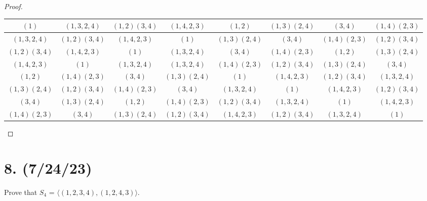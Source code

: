 \documentclass{article}
\begin{document}
\begin{proof}
    \begin{table}[h]
        \scriptsize
        \setlength{\tabcolsep}{0.4em} %
        \begin{tabu}{ |c|c|c|c|c|c|c|c| } 
            \hline
            $(1)$ & $(1, 3, 2, 4)$ & $(1, 2)(3, 4)$ & $(1, 4, 2, 3)$ & $(1, 2)$ & $(1, 3)(2, 4)$ & $(3, 4)$ & $(1, 4)(2, 3)$ \\
            \hline
            $(1, 3, 2, 4)$ & $(1, 2)(3, 4)$ & $(1, 4, 2, 3)$ & $(1)$ & $(1, 3)(2, 4)$ & $(3, 4)$ & $(1, 4)(2, 3)$ & $(1, 2)(3, 4)$ \\ 
            \hline
            $(1, 2)(3, 4)$ & $(1, 4, 2, 3)$ & $(1)$ & $(1, 3, 2, 4)$ & $(3, 4)$ & $(1, 4)(2, 3)$ & $(1, 2)$ & $(1, 3)(2, 4)$ \\
            \hline
            $(1, 4, 2, 3)$ & $(1)$ & $(1, 3, 2, 4)$ & $(1, 3, 2, 4)$ & $(1, 4)(2, 3)$ & $(1, 2)(3, 4)$ & $(1, 3)(2, 4)$ & $(3, 4)$ \\
            \hline
            $(1, 2)$ & $(1, 4)(2, 3)$ & $(3, 4)$ & $(1, 3)(2, 4)$ & $(1)$ & $(1, 4, 2, 3)$ & $(1, 2)(3, 4)$ & $(1, 3, 2, 4)$ \\
            \hline
            $(1, 3)(2, 4)$ & $(1, 2)(3, 4)$ & $(1, 4)(2, 3)$ & $(3, 4)$ & $(1, 3, 2, 4)$ & $(1)$ & $(1, 4, 2, 3)$ & $(1, 2)(3, 4)$ \\
            \hline
            $(3, 4)$ & $(1, 3)(2, 4)$ & $(1, 2)$ & $(1, 4)(2, 3)$ & $(1, 2)(3, 4)$ & $(1, 3, 2, 4)$ & $(1)$ & $(1, 4, 2, 3)$ \\
            \hline
            $(1, 4)(2, 3)$ & $(3, 4)$ & $(1, 3)(2, 4)$ & $(1, 2)(3, 4)$ & $(1, 4, 2, 3)$ & $(1, 2)(3, 4)$ & $(1, 3, 2, 4)$ & $(1)$ \\
            \hline
        \end{tabu}
    \end{table}
\end{proof}

\section*{8. (7/24/23)}

Prove that $S_4$ = $\langle (1, 2, 3, 4), (1, 2, 4, 3) \rangle$.
\end{document}
